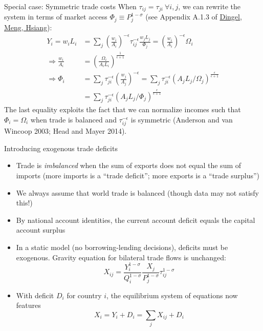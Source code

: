 \documentclass[10pt,notes=hide,aspectratio=169]{beamer}
\begin{document}
\begin{frame}{Special case: Symmetric trade costs}
When $\tau_{ij} = \tau_{ji} \ \forall i,j$,
we can rewrite the system in terms of market access $\Phi_j \equiv P_j^{1-\sigma}$
(see Appendix A.1.3 of \href{http://www.jdingel.com/research/DingelMengHsiang.pdf}{Dingel, Meng, Hsiang}):
\begin{align*}
Y_i = w_i L_i  	&= \sum_j \left(\frac{w_i}{A_i}\right)^{-\epsilon}\tau_{ij}^{-\epsilon} \frac{w_j L_j}{\Phi_j}
			= \left(\frac{w_i}{A_i}\right)^{-\epsilon} \Omega_i \\
\Rightarrow \frac{w_i}{A_i}	&= \left(\frac{\Omega_i}{A_i L_i}\right)^{\frac{1}{\epsilon+1}} \\
\Rightarrow \Phi_i 	&= \sum_j \tau_{ji}^{-\epsilon} \left(\frac{w_j}{A_j}\right)^{-\epsilon} 
					= \sum_j \tau_{ji}^{-\epsilon} \left(A_j L_j / \Omega_j\right)^{\frac{\epsilon}{\epsilon+1}}\\
					&= \sum_j \tau_{ji}^{-\epsilon} \left(A_j L_j / \Phi_j\right)^{\frac{\epsilon}{\epsilon+1}}
\end{align*}
The last equality exploits the fact that 
we can normalize incomes such that $\Phi_i = \Omega_i$
when trade is balanced and $\tau_{ij}^{-\epsilon}$ is symmetric
(Anderson and van Wincoop 2003; Head and Mayer 2014).
\end{frame}
\begin{frame}{Introducing exogenous trade deficits}
\begin{itemize}
\item
Trade is \textit{imbalanced} when the sum of exports does not equal the sum of imports
(more imports is a ``trade deficit''; more exports is a ``trade surplus'')
\item
We always assume that world trade is balanced (though data may not satisfy this!)
\item
By national account identities, the current account deficit equals the capital account surplus
\item
In a static model (no borrowing-lending decisions), deficits must be exogenous.
Gravity equation for bilateral trade flows is unchanged:
\begin{equation*}
X_{ij}	= \frac{Y_i^{1-\sigma}}{Q_i^{1-\sigma}} \frac{X_j}{P_j^{1-\sigma}}\tau_{ij}^{1-\sigma}
\end{equation*}
\item With deficit $D_i$ for country $i$, the equilibrium system of equations now features
\begin{equation*}
X_i = Y_i + D_i = \sum_j X_{ij} + D_i
\end{equation*}
\end{itemize}
\end{frame}
\end{document}
